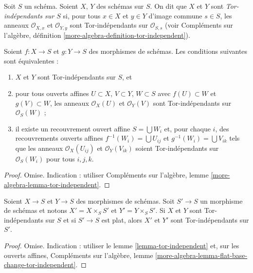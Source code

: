 \begin{definition}
\label{definition-tor-independent}
Soit $S$ un schéma. Soient $X$, $Y$ des schémas sur $S$. On dit que $X$ et
$Y$ sont {\it Tor-indépendants sur $S$} si, pour tous $x \in X$ et
$y \in Y$ d'image commune $s \in S$, les anneaux
$\mathcal{O}_{X, x}$ et $\mathcal{O}_{Y, y}$ sont Tor-indépendants
sur $\mathcal{O}_{S, s}$ (voir
Compléments sur l'algèbre, définition \ref{more-algebra-definition-tor-independent}).
\end{definition}

\begin{lemma}
\label{lemma-tor-independent}
Soient $f : X \to S$ et $g : Y \to S$ des morphismes de schémas.
Les conditions suivantes sont équivalentes :
\begin{enumerate}
\item $X$ et $Y$ sont Tor-indépendants sur $S$, et
\item pour tous ouverts affines $U \subset X$, $V \subset Y$, $W \subset S$
avec $f(U) \subset W$ et $g(V) \subset W$, les anneaux
$\mathcal{O}_X(U)$ et $\mathcal{O}_Y(V)$ sont Tor-indépendants sur
$\mathcal{O}_S(W)$ ;
\item il existe un recouvrement ouvert affine $S = \bigcup W_i$ et,
pour chaque $i$, des recouvrements ouverts affines $f^{-1}(W_i) = \bigcup U_{ij}$
et $g^{-1}(W_i) = \bigcup V_{ik}$ tels que les anneaux
$\mathcal{O}_X(U_{ij})$ et $\mathcal{O}_Y(V_{ik})$ soient Tor-indépendants sur
$\mathcal{O}_S(W_i)$ pour tous $i, j, k$.
\end{enumerate}
\end{lemma}

\begin{proof}
Omise. Indication : utiliser Compléments sur l'algèbre, lemme
\ref{more-algebra-lemma-tor-independent}.
\end{proof}

\begin{lemma}
\label{lemma-flat-base-change-tor-independent}
Soient $X \to S$ et $Y \to S$ des morphismes de schémas. Soit $S' \to S$ un
morphisme de schémas et notons $X' = X \times_S S'$
et $Y' = Y \times_S S'$.
Si $X$ et $Y$ sont Tor-indépendants sur $S$ et si $S' \to S$ est plat,
alors $X'$ et $Y'$ sont Tor-indépendants sur $S'$.
\end{lemma}

\begin{proof}
Omise. Indication : utiliser le lemme \ref{lemma-tor-independent} et,
sur les ouverts affines, Compléments sur l'algèbre, lemme
\ref{more-algebra-lemma-flat-base-change-tor-independent}.
\end{proof}

